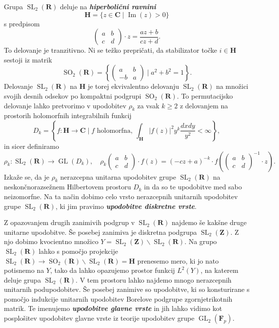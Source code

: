 \documentclass[11pt]{book}
\def\ZZ{\mathbf{Z}}
\def\RR{\mathbf{R}}
\def\CC{\mathbf{C}}
\def\FF{\mathbf{F}}
\def\HH{\mathbf{H}}
\DeclareMathOperator\GL{GL}
\DeclareMathOperator\SL{SL}
\DeclareMathOperator\SO{SO}
\DeclareMathOperator\imaginary{Im}
\def\definicija{\color{rdeca}\bf\em}
\theoremstyle{definition}
\theoremstyle{zgled}
\theoremstyle{odprtproblem}
\theoremstyle{domacanaloga}
\theoremstyle{izrek}
\begin{document}
Grupa $\SL_2(\RR)$ deluje na {\definicija hiperbolični ravnini}
\[
    \HH = \{  z \in \CC \mid \imaginary(z) > 0 \}
\]
s predpisom
\[
    \begin{pmatrix}
        a & b \\ c & d
    \end{pmatrix}
    \cdot z
    =
    \frac{az + b}{cz + d}.
\]
To delovanje je tranzitivno. Ni se težko prepričati, da stabilizator točke $i \in \HH$ sestoji iz matrik
\[
    {\textstyle \SO_2(\RR)} = \left\{ \begin{pmatrix} a & b \\ -b & a \end{pmatrix} \mid a^2 + b^2 = 1 \right\}.
\]
Delovanje $\SL_2(\RR)$ na $\HH$ je torej ekvivalentno delovanju $\SL_2(\RR)$ na množici svojih desnih odsekov po kompaktni podgrupi $\SO_2(\RR)$. To permutacijsko delovanje lahko pretvorimo v upodobitev $\rho_k$ za vsak $k \geq 2$ z delovanjem na prostorih holomorfnih integrabilnih funkcij
\[
    D_k = \left\{ f \colon \HH \to \CC \mid \text{$f$ holomorfna}, \ \int_{\HH} |f(z)|^2 y^k \frac{dx dy}{y^2} < \infty \right\},
\]
in sicer definiramo
\[
    \rho_k \colon {\textstyle \SL_2(\RR)} \to \GL(D_k), \quad
    \rho_k \begin{pmatrix}
        a & b \\ c & d
    \end{pmatrix}
    \cdot f (z)
    = (-cz + a)^{-k} \cdot f\left( \begin{pmatrix}
        a & b \\ c & d
    \end{pmatrix}^{-1} \cdot z \right).
\]
Izkaže se, da je $\rho_k$ nerazcepna unitarna upodobitev grupe $\SL_2(\RR)$ na neskončnorazsežnem Hilbertovem prostoru $D_k$ in da so te upodobitve med sabo neizomorfne. Na ta način dobimo celo vrsto nerazcepnih unitarnih upodobitev grupe $\SL_2(\RR)$, ki jim pravimo {\definicija upodobitve diskretne vrste}.

Z opazovanjem drugih zanimivih podgrup v $\SL_2(\RR)$ najdemo še kakšne druge unitarne upodobitve. Še posebej zanimiva je diskretna podgrupa $\SL_2(\ZZ)$. Z njo dobimo kvocientno množico $Y = \SL_2(\ZZ) \backslash \SL_2(\RR)$. Na grupo $\SL_2(\RR)$ lahko s pomočjo projekcije $\SL_2(\RR) \to \SO_2(\RR) \backslash \SL_2(\RR) = \HH$ prenesemo mero, ki jo nato potisnemo na $Y$, tako da lahko opazujemo prostor funkcij $L^2(Y)$, na katerem deluje grupa $\SL_2(\RR)$. V tem prostoru lahko najdemo mnogo nerazcepnih unitarnih podupodobitev. Še posebej zanimive so upodobitve, ki so konsturirane s pomočjo indukcije unitarnih upodobitev Borelove podgrupe zgornjetrikotnih matrik. Te imenujemo {\definicija upodobitve glavne vrste} in jih lahko vidimo kot posplošitev upodobitev glavne vrste iz teorije upodobitev grupe $\GL_2(\FF_p)$.
\end{document}
